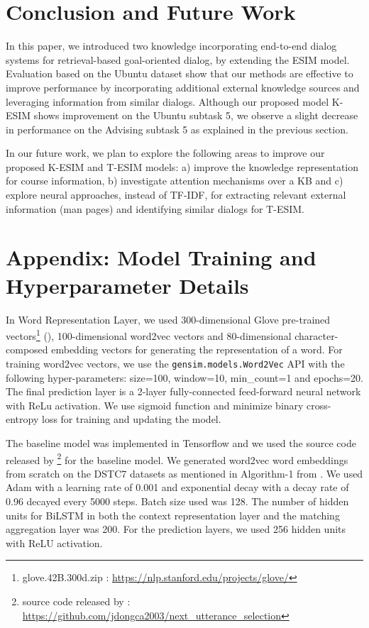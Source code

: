 \documentclass[letterpaper]{article} %
\begin{document}
\section{Conclusion and Future Work}
In this paper, we introduced two knowledge incorporating end-to-end dialog systems for retrieval-based goal-oriented dialog, by extending the ESIM model. Evaluation based on the Ubuntu dataset show that our methods are effective to improve performance by incorporating additional external knowledge sources and leveraging information from similar dialogs. Although our proposed model K-ESIM shows improvement on the Ubuntu subtask 5, we observe a slight decrease in performance on the Advising subtask 5 as explained in the previous section.

In our future work, we plan to explore the following areas to improve our proposed K-ESIM and T-ESIM models: a) improve the knowledge representation for course information, b) investigate attention mechanisms over a KB \cite{eric2017key} and c) explore neural approaches, instead of TF-IDF, for extracting relevant external information (man pages) and identifying similar dialogs for T-ESIM. 

\section{Appendix: Model Training and Hyperparameter Details}
In Word Representation Layer, we used 300-dimensional Glove pre-trained vectors\footnote{glove.42B.300d.zip : \url{https://nlp.stanford.edu/projects/glove/}} (\cite{pennington2014glove}), 100-dimensional word2vec vectors \cite{mikolov2013efficient} and 80-dimensional character-composed embedding vectors for generating the representation of a word. For training word2vec vectors, we use the \texttt{gensim.models.Word2Vec} API with the following hyper-parameters: size=100, window=10, min\_count=1 and epochs=20. The final prediction layer is a 2-layer fully-connected feed-forward neural network with ReLu activation. We use sigmoid function and minimize binary cross-entropy loss for training and updating the model.

The baseline model was implemented in Tensorflow \cite{abadi2016tensorflow} and we used the source code released by \citeauthor{dong2018enhance} \footnote{source code released by \citeauthor{dong2018enhance} : \url{https://github.com/jdongca2003/next_utterance_selection}} for the baseline model. We generated word2vec word embeddings from scratch on the DSTC7 datasets as mentioned in Algorithm-1 from \citeauthor{dong2018enhance} . We used Adam \cite{kingma2014adam} with a learning rate of 0.001 and exponential decay with a decay rate of 0.96 decayed every 5000 steps. Batch size used was 128. The number of hidden units for BiLSTM in both the context representation layer and the matching aggregation layer was 200. For the prediction layers, we used 256 hidden units with ReLU activation. 

\newpage


\end{document}
